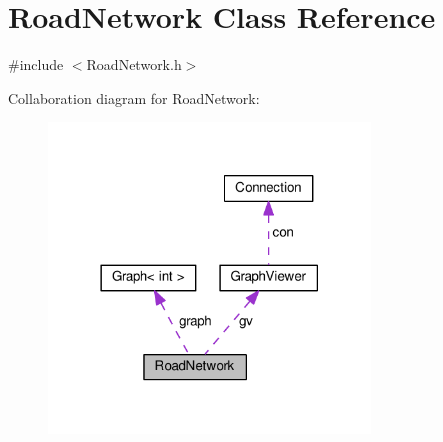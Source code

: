 \hypertarget{classRoadNetwork}{}\section{Road\+Network Class Reference}
\label{classRoadNetwork}


{\ttfamily \#include $<$Road\+Network.\+h$>$}



Collaboration diagram for Road\+Network\+:\nopagebreak
\begin{figure}[H]
\begin{center}
\leavevmode
\includegraphics[width=242pt]{classRoadNetwork__coll__graph}
\end{center}
\end{figure}
